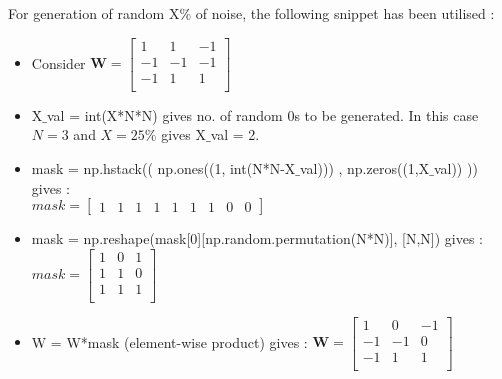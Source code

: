 \documentclass{article} %
\begin{document}
\noindent For generation of random X$\%$ of noise, the following snippet has been utilised :
\begin{itemize}
    \item Consider $\boldsymbol{W} = \begin{bmatrix}
                                    1 & 1 & -1 \\
                                    -1 & -1 & -1\\
                                    -1 & 1 & 1 \\
                                    \end{bmatrix}$
    \item X$\_$val = int(X*N*N) gives no. of random $0$s to be generated. In this case $N=3$ and $X = 25\%$ gives X$\_$val = 2.
    \item mask = np.hstack(( np.ones((1, int(N*N-X$\_$val))) , np.zeros((1,X$\_$val)) )) gives :\\ $mask = \begin{bmatrix}
                                    1 & 1 & 1 &
                                    1 & 1 & 1 &
                                    1 & 0 & 0 
                                    \end{bmatrix}$ 
    \item mask = np.reshape(mask[0][np.random.permutation(N*N)], [N,N]) gives : 
                                    $mask = \begin{bmatrix}
                                                1 & 0 & 1 \\
                                                1 & 1 & 0\\
                                                1 & 1 & 1 \\
                                                \end{bmatrix}$
    \item W = W*mask (element-wise product) gives :  $\boldsymbol{W} = \begin{bmatrix}
                                                    1 & 0 & -1 \\
                                                    -1 & -1 & 0\\
                                                    -1 & 1 & 1 \\
                                                    \end{bmatrix}$
\end{itemize}
\end{document}
